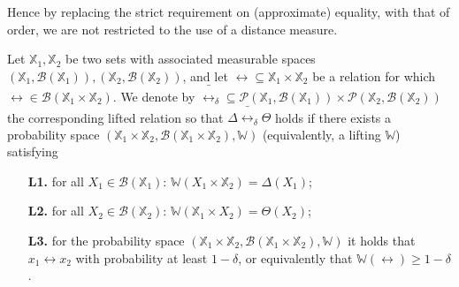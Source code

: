 \documentclass{ifacconf}
\newcommand{\X}{{\mathbb{X}}}
\begin{document}
Hence by replacing the strict requirement on (approximate) equality, with that of order,   we are not restricted to the use of a distance measure. %
 


\begin{definition}\label{def:del_lifting}
	Let $\X_1,\X_2$ be two sets with associated measurable spaces $(\X_1,\mathcal B(\X_1)), (\X_2,\mathcal B(\X_2))$,
	and let  $\rel\subseteq \X_1\times \X_2$ be a relation for which $\rel\in \mathcal B(\X_1\times \X_2)$.
	We denote by
	$\bar\rel_\delta\subseteq \mathcal{P}(\X_1,\mathcal B(\X_1))\times \mathcal{P}(\X_2,\mathcal B(\X_2))$ the corresponding lifted relation so that $\Delta \bar \rel_\delta \Theta$ holds if there exists a probability space $(\X_1\times \X_2,\mathcal B(\X_1\times \X_2), \mathbb W)$  (equivalently, a lifting $\mathbb W$) satisfying { \setlength{\parskip}{-1pt}\setlength{\parsep}{0pt}
		\begin{enumerate}
			\item[\textbf{L1.}] for all $X_1\in \mathcal{B}(\X_1)$: $\mathbb W(X_1\times \X_2)=\Delta(X_1)$;
			\item [\textbf{L2.}] for all $X_2\in \mathcal{B}(\X_2)$:  $\mathbb W(\X_1\times X_2)=\Theta(X_2)$;
			\item[\textbf{L3.}] for the probability space  $(\X_1\times \X_2,\mathcal B(\X_1\times \X_2), \mathbb W)$ it holds that
			$x_1\rel x_2$ with probability at least $1-\delta$, or equivalently that $\mathbb{W}\left(\rel\right)\geq1-\delta$.
	\end{enumerate}}%
\end{definition}
\end{document}
